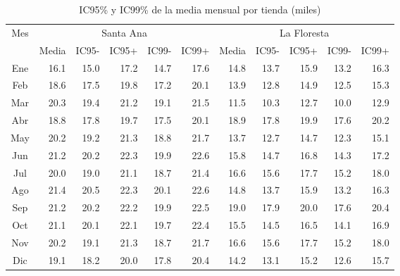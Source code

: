 \documentclass[12pt,a4paper]{article}
\begin{document}
\begin{table}[H]
  \centering
  \small
  \begin{tabular}{c rrrrr | rrrrr}
    \toprule
    Mes & \multicolumn{5}{c}{Santa Ana} & \multicolumn{5}{c}{La Floresta}\\
         & Media & IC95- & IC95+ & IC99- & IC99+ & Media & IC95- & IC95+ & IC99- & IC99+\\
    \midrule
    Ene & 16.1 & 15.0 & 17.2 & 14.7 & 17.6 & 14.8 & 13.7 & 15.9 & 13.2 & 16.3\\
    Feb & 18.6 & 17.5 & 19.8 & 17.2 & 20.1 & 13.9 & 12.8 & 14.9 & 12.5 & 15.3\\
    Mar & 20.3 & 19.4 & 21.2 & 19.1 & 21.5 & 11.5 & 10.3 & 12.7 & 10.0 & 12.9\\
    Abr & 18.8 & 17.8 & 19.7 & 17.5 & 20.1 & 18.9 & 17.8 & 19.9 & 17.6 & 20.2\\
    May & 20.2 & 19.2 & 21.3 & 18.8 & 21.7 & 13.7 & 12.7 & 14.7 & 12.3 & 15.1\\
    Jun & 21.2 & 20.2 & 22.3 & 19.9 & 22.6 & 15.8 & 14.7 & 16.8 & 14.3 & 17.2\\
    Jul & 20.0 & 19.0 & 21.1 & 18.7 & 21.4 & 16.6 & 15.6 & 17.7 & 15.2 & 18.0\\
    Ago & 21.4 & 20.5 & 22.3 & 20.1 & 22.6 & 14.8 & 13.7 & 15.9 & 13.2 & 16.3\\
    Sep & 21.2 & 20.2 & 22.2 & 19.9 & 22.5 & 19.0 & 17.9 & 20.0 & 17.6 & 20.4\\
    Oct & 21.1 & 20.1 & 22.1 & 19.7 & 22.4 & 15.5 & 14.5 & 16.5 & 14.1 & 16.9\\
    Nov & 20.2 & 19.1 & 21.3 & 18.7 & 21.7 & 16.6 & 15.6 & 17.7 & 15.2 & 18.0\\
    Dic & 19.1 & 18.2 & 20.0 & 17.8 & 20.4 & 14.2 & 13.1 & 15.2 & 12.6 & 15.7\\
    \bottomrule
  \end{tabular}
  \caption{IC95\% y IC99\% de la media mensual por tienda (miles)}
\end{table}
\end{document}
